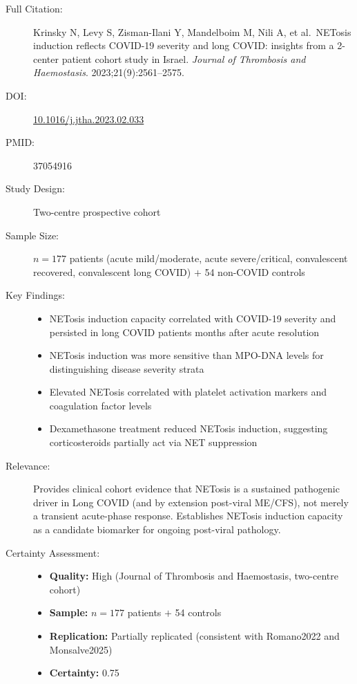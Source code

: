 \begin{description}
    \item[Full Citation:] Krinsky N, Levy S, Zisman-Ilani Y, Mandelboim M, Nili A, et al.\ NETosis induction reflects COVID-19 severity and long COVID: insights from a 2-center patient cohort study in Israel. \textit{Journal of Thrombosis and Haemostasis}. 2023;21(9):2561--2575. \cite{Krinsky2023}
    \item[DOI:] \href{https://doi.org/10.1016/j.jtha.2023.02.033}{10.1016/j.jtha.2023.02.033}
    \item[PMID:] 37054916
    \item[Study Design:] Two-centre prospective cohort
    \item[Sample Size:] $n=177$ patients (acute mild/moderate, acute severe/critical, convalescent recovered, convalescent long COVID) $+$ 54 non-COVID controls
    \item[Key Findings:]
    \begin{itemize}
        \item NETosis induction capacity correlated with COVID-19 severity and persisted in long COVID patients months after acute resolution
        \item NETosis induction was more sensitive than MPO-DNA levels for distinguishing disease severity strata
        \item Elevated NETosis correlated with platelet activation markers and coagulation factor levels
        \item Dexamethasone treatment reduced NETosis induction, suggesting corticosteroids partially act via NET suppression
    \end{itemize}
    \item[Relevance:] Provides clinical cohort evidence that NETosis is a sustained pathogenic driver in Long COVID (and by extension post-viral ME/CFS), not merely a transient acute-phase response. Establishes NETosis induction capacity as a candidate biomarker for ongoing post-viral pathology.
    \item[Certainty Assessment:]
    \begin{itemize}
        \item \textbf{Quality:} High (Journal of Thrombosis and Haemostasis, two-centre cohort)
        \item \textbf{Sample:} $n=177$ patients $+$ 54 controls
        \item \textbf{Replication:} Partially replicated (consistent with Romano2022 and Monsalve2025)
        \item \textbf{Certainty:} 0.75
    \end{itemize}
\end{description}


